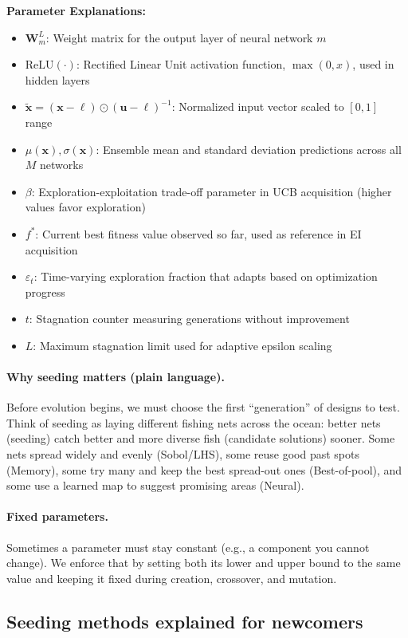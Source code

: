 \documentclass[12pt,a4paper]{article}
\begin{document}
\textbf{Parameter Explanations:}
\begin{itemize}
\item $\bm{W}_m^L$: Weight matrix for the output layer of neural network $m$
\item $\text{ReLU}(\cdot)$: Rectified Linear Unit activation function, $\max(0, x)$, used in hidden layers
\item $\tilde{\bm{x}} = (\bm{x} - \bm{\ell}) \odot (\bm{u} - \bm{\ell})^{-1}$: Normalized input vector scaled to $[0,1]$ range
\item $\mu(\bm{x}), \sigma(\bm{x})$: Ensemble mean and standard deviation predictions across all $M$ networks
\item $\beta$: Exploration-exploitation trade-off parameter in UCB acquisition (higher values favor exploration)
\item $f^*$: Current best fitness value observed so far, used as reference in EI acquisition
\item $\varepsilon_t$: Time-varying exploration fraction that adapts based on optimization progress
\item $t$: Stagnation counter measuring generations without improvement
\item $L$: Maximum stagnation limit used for adaptive epsilon scaling
\end{itemize}

\paragraph{Why seeding matters (plain language).}
Before evolution begins, we must choose the first ``generation'' of designs to test. Think of seeding as laying different fishing nets across the ocean: better nets (seeding) catch better and more diverse fish (candidate solutions) sooner. Some nets spread widely and evenly (Sobol/LHS), some reuse good past spots (Memory), some try many and keep the best spread-out ones (Best-of-pool), and some use a learned map to suggest promising areas (Neural).

\paragraph{Fixed parameters.}
Sometimes a parameter must stay constant (e.g., a component you cannot change). We enforce that by setting both its lower and upper bound to the same value and keeping it fixed during creation, crossover, and mutation.

\subsection*{Seeding methods explained for newcomers}
\end{document}
